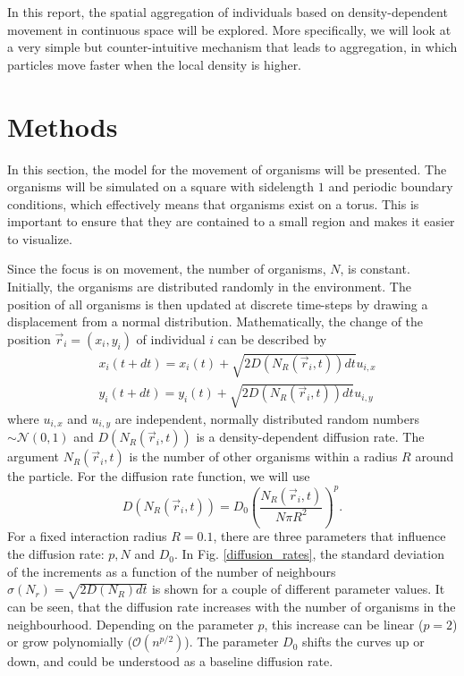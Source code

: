 \documentclass{article}
\begin{document}
In this report, the spatial aggregation of individuals based on density-dependent movement in continuous space will be explored.
More specifically, we will look at a very simple but counter-intuitive mechanism that leads to aggregation, in which particles move faster when the local density is higher. 


\section{Methods}
In this section, the model for the movement of organisms will be presented. 
The organisms will be simulated on a square with sidelength $1$ and periodic boundary conditions, which effectively means that organisms exist on a torus.
This is important to ensure that they are contained to a small region and makes it easier to visualize.



Since the focus is on movement, the number of organisms, $N$, is constant.
Initially, the organisms are distributed randomly in the environment. 
The position of all organisms is then updated at discrete time-steps by drawing a displacement from a normal distribution.
Mathematically, the change of the position $\vec{r}_i = (x_i, y_i)$ of individual $i$ can be described by
\begin{align}
    & x_i(t + dt) = x_i(t) + \sqrt{2D(N_R(\vec{r}_i, t)) dt} u_{i,x} \\
    & y_i(t + dt) = y_i(t) + \sqrt{2D(N_R(\vec{r}_i, t)) dt} u_{i,y}
\end{align}
where $u_{i,x}$ and $u_{i,y}$ are independent, normally distributed random numbers $\sim \mathcal{N}(0,1)$ and $D(N_R(\vec{r}_i, t))$ is a density-dependent diffusion rate.
The argument $N_R(\vec{r}_i, t)$ is the number of other organisms within a radius $R$ around the particle. 
For the diffusion rate function, we will use
\begin{equation}
    D(N_R(\vec{r}_i, t)) = D_0\left( \frac{N_R(\vec{r}_i, t)}{N\pi R^2} \right)^p.
\end{equation}
For a fixed interaction radius $R=0.1$, there are three parameters that influence the diffusion rate: $p, N$ and $D_0$.
In Fig. \ref{diffusion_rates}, the standard deviation of the increments as a function of the number of neighbours $\sigma(N_r) = \sqrt{2D(N_R) dt}$ is shown for a couple of different parameter values.
It can be seen, that the diffusion rate increases with the number of organisms in the neighbourhood.
Depending on the parameter $p$, this increase can be linear ($p=2$) or grow polynomially ($\mathcal{O}(n^{p/2})$). 
The parameter $D_0$ shifts the curves up or down, and could be understood as a baseline diffusion rate.
\end{document}
